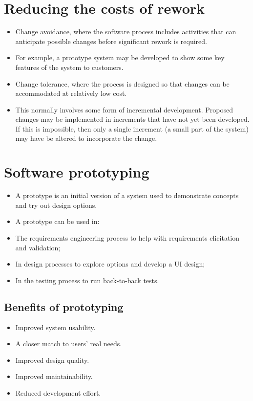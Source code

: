 \section{Reducing the costs of rework}
\begin{itemize}
\item Change avoidance, where the software process includes activities that can anticipate possible changes before significant rework is required.

\item For example, a prototype system may be developed to show some key features of the system to customers.

\item Change tolerance, where the process is designed so that changes can be accommodated at relatively low cost.

\item This normally involves some form of incremental development. Proposed changes may be implemented in increments that have not yet been developed. If this is impossible, then only a single increment (a small part of the system) may have be altered to incorporate the change.
\end{itemize}


\section{Software prototyping}
\begin{itemize}
\item A prototype is an initial version of a system used to demonstrate concepts and try out design options.

\item A prototype can be used in:

\item The requirements engineering process to help with requirements elicitation and validation;
\item In design processes to explore options and develop a UI design; \item In the testing process to run back-to-back tests.
\end{itemize}


\subsection{Benefits of prototyping}
\begin{itemize}
\item Improved system usability.

\item A closer match to users' real needs.

\item Improved design quality.

\item Improved maintainability.

\item Reduced development effort.
\end{itemize}

